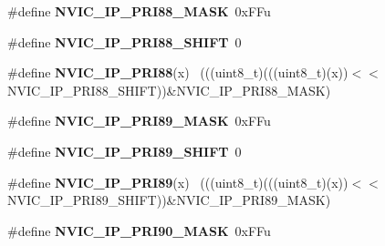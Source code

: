 \begin{DoxyCompactItemize}
\item 
\hypertarget{group___n_v_i_c___register___masks_gab16ae2d8c26452791f820ec5d05d12ca}{}\#define {\bfseries N\+V\+I\+C\+\_\+\+I\+P\+\_\+\+P\+R\+I88\+\_\+\+M\+A\+S\+K}~0x\+F\+Fu\label{group___n_v_i_c___register___masks_gab16ae2d8c26452791f820ec5d05d12ca}

\item 
\hypertarget{group___n_v_i_c___register___masks_ga42df75a007b58b793f8a9ad4efe0408d}{}\#define {\bfseries N\+V\+I\+C\+\_\+\+I\+P\+\_\+\+P\+R\+I88\+\_\+\+S\+H\+I\+F\+T}~0\label{group___n_v_i_c___register___masks_ga42df75a007b58b793f8a9ad4efe0408d}

\item 
\hypertarget{group___n_v_i_c___register___masks_gaceb65ac080388f72e1f5e968fbcd8db5}{}\#define {\bfseries N\+V\+I\+C\+\_\+\+I\+P\+\_\+\+P\+R\+I88}(x)                                              ~(((uint8\+\_\+t)(((uint8\+\_\+t)(x))$<$$<$N\+V\+I\+C\+\_\+\+I\+P\+\_\+\+P\+R\+I88\+\_\+\+S\+H\+I\+F\+T))\&N\+V\+I\+C\+\_\+\+I\+P\+\_\+\+P\+R\+I88\+\_\+\+M\+A\+S\+K)\label{group___n_v_i_c___register___masks_gaceb65ac080388f72e1f5e968fbcd8db5}

\item 
\hypertarget{group___n_v_i_c___register___masks_gaa40ed2620dcb6050a92b861005e7efce}{}\#define {\bfseries N\+V\+I\+C\+\_\+\+I\+P\+\_\+\+P\+R\+I89\+\_\+\+M\+A\+S\+K}~0x\+F\+Fu\label{group___n_v_i_c___register___masks_gaa40ed2620dcb6050a92b861005e7efce}

\item 
\hypertarget{group___n_v_i_c___register___masks_ga9040b4c1d6aed588e4d7d81db4a4f11c}{}\#define {\bfseries N\+V\+I\+C\+\_\+\+I\+P\+\_\+\+P\+R\+I89\+\_\+\+S\+H\+I\+F\+T}~0\label{group___n_v_i_c___register___masks_ga9040b4c1d6aed588e4d7d81db4a4f11c}

\item 
\hypertarget{group___n_v_i_c___register___masks_gac15d5c57738912ab8aa3143ccd734a2f}{}\#define {\bfseries N\+V\+I\+C\+\_\+\+I\+P\+\_\+\+P\+R\+I89}(x)                                              ~(((uint8\+\_\+t)(((uint8\+\_\+t)(x))$<$$<$N\+V\+I\+C\+\_\+\+I\+P\+\_\+\+P\+R\+I89\+\_\+\+S\+H\+I\+F\+T))\&N\+V\+I\+C\+\_\+\+I\+P\+\_\+\+P\+R\+I89\+\_\+\+M\+A\+S\+K)\label{group___n_v_i_c___register___masks_gac15d5c57738912ab8aa3143ccd734a2f}

\item 
\hypertarget{group___n_v_i_c___register___masks_ga42ca747d1109b00b36abfc1a359bff19}{}\#define {\bfseries N\+V\+I\+C\+\_\+\+I\+P\+\_\+\+P\+R\+I90\+\_\+\+M\+A\+S\+K}~0x\+F\+Fu\label{group___n_v_i_c___register___masks_ga42ca747d1109b00b36abfc1a359bff19}


\end{DoxyCompactItemize}
